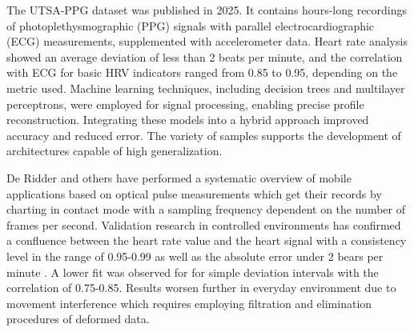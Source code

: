 \documentclass[journal]{IEEEtran}
\begin{document}
The UTSA-PPG dataset \cite{18} was published in 2025. It contains hours-long recordings of photoplethysmographic (PPG) signals with parallel electrocardiographic (ECG) measurements, supplemented with accelerometer data. Heart rate analysis showed an average deviation of less than 2 beats per minute, and the correlation with ECG for basic HRV indicators ranged from 0.85 to 0.95, depending on the metric used. Machine learning techniques, including decision trees and multilayer perceptrons, were employed for signal processing, enabling precise profile reconstruction. Integrating these models into a hybrid approach improved accuracy and reduced error. The variety of samples supports the development of architectures capable of high generalization.

\newpage
De Ridder and others \cite{19} have performed a systematic overview of mobile applications based on optical pulse measurements which get their records by charting in contact mode with a sampling frequency dependent on the number of frames per second. Validation research in controlled environments has confirmed a confluence between the heart rate value and the heart signal with a consistency level in the range of 0.95-0.99 as well as the absolute error under 2 bears per minute \cite{20}. A lower fit was observed for for simple deviation intervals with the correlation of 0.75-0.85. Results worsen further in everyday environment due to movement interference which requires employing filtration and elimination procedures of deformed data.
\end{document}
